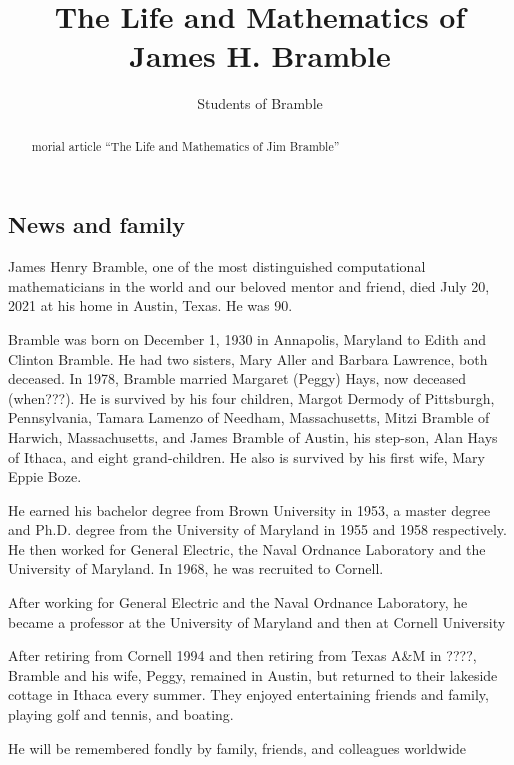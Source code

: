\documentclass[CJK,11pt]{amsart}
\theoremstyle{definition}
\begin{document}
\begin{CJK*}{UTF8}{gbsn}
\title{
The Life and Mathematics of James H. Bramble
}
\author{Students of Bramble}
\begin{abstract}
 morial article “The Life and Mathematics of Jim Bramble”
\end{abstract}
\maketitle

\section{News and family}
James Henry Bramble, one of the most distinguished computational mathematicians in the world and our beloved mentor and friend, died July 20, 2021 at his home in Austin, Texas. He was 90.

Bramble was born on December 1, 1930 in Annapolis, Maryland to Edith and Clinton Bramble. He had two sisters, Mary Aller and Barbara Lawrence, both deceased. 
In 1978, Bramble married Margaret (Peggy) Hays, now deceased (when???). 
He is survived by his four children, Margot Dermody of Pittsburgh, Pennsylvania, Tamara Lamenzo of Needham, Massachusetts, Mitzi Bramble of Harwich, Massachusetts, and James Bramble of Austin, his step-son, Alan Hays of Ithaca, and eight grand-children. He also is survived by his first wife, Mary Eppie Boze. 

He earned his bachelor degree from Brown University in 1953,  a master degree and Ph.D. degree from the University of Maryland in 1955 and 1958 respectively. He then worked for General Electric, the Naval Ordnance Laboratory and the University of Maryland. In 1968, he was recruited to Cornell.  

After working for General Electric and the Naval Ordnance Laboratory, he became a professor at the University of Maryland and then at Cornell University

After retiring from Cornell 1994 and then retiring from Texas A\&M in ????, Bramble and his wife, Peggy, remained in Austin, but returned to their lakeside cottage in Ithaca every summer. 
They enjoyed entertaining friends and family, playing golf and tennis, and boating.

He will be remembered fondly by family, friends, and colleagues worldwide


\end{CJK*}
\end{document}
